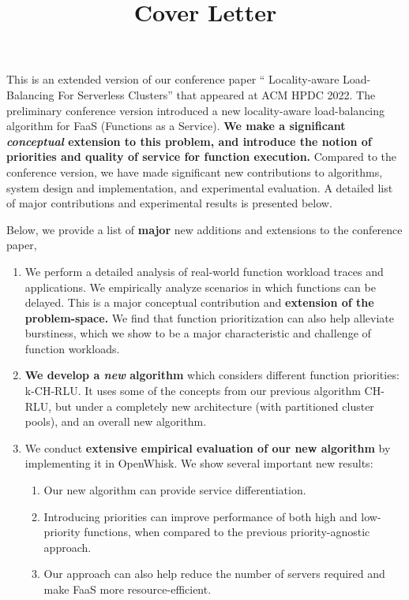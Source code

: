\documentclass[11pt, letterpaper]{article}
\title{Cover Letter}
\date{}
\begin{document}
\maketitle

This is an extended version of our conference paper `` Locality-aware Load-Balancing For Serverless Clusters'' that appeared at ACM HPDC 2022. 
The preliminary conference version introduced a new locality-aware load-balancing algorithm for FaaS (Functions as a Service). 
\textbf{We make a significant \emph{conceptual} extension to this problem, and introduce the notion of priorities and quality of service for function execution.}
Compared to the conference version, we have made significant new contributions to algorithms, system design and implementation, and experimental evaluation. A detailed list of major contributions and experimental results is presented below.


Below, we provide a list of \textbf{major} new additions and extensions to the conference paper,


\begin{enumerate}
\item We perform a detailed analysis of real-world function workload traces and applications. We empirically analyze scenarios in which functions can be delayed. This is a major conceptual contribution and \textbf{extension of the problem-space.} We find that function prioritization can also help alleviate burstiness, which we show to be a major characteristic and challenge of function workloads. 
\item \textbf{We develop a \emph{new} algorithm} which considers different function priorities: k-CH-RLU. It uses some of the concepts from our previous algorithm CH-RLU, but under a completely new architecture (with partitioned cluster pools), and an overall new algorithm. 
\item We conduct \textbf{extensive empirical evaluation of our new algorithm} by implementing it in OpenWhisk. We show several important new results:
  \begin{enumerate}
  \item Our new algorithm can provide service differentiation. 
  \item Introducing priorities can improve performance of both high and low-priority functions, when compared to the previous priority-agnostic approach. 
  \item Our approach can also help reduce the number of servers required and make FaaS more resource-efficient. 
  \end{enumerate}
\end{enumerate}
\end{document}
